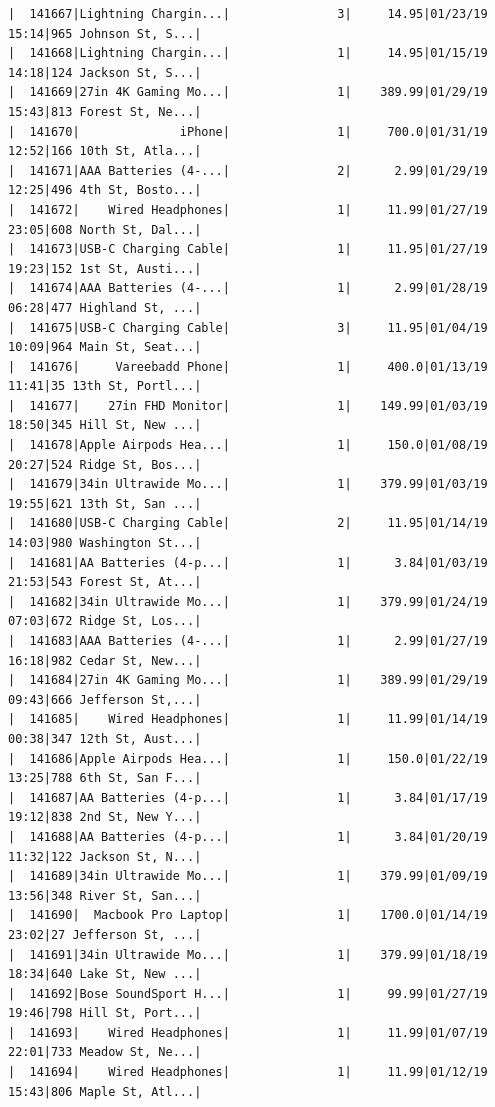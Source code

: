 \documentclass[
  letterpaper,
  DIV=11,
  numbers=noendperiod]{scrartcl}
\begin{document}
\begin{verbatim}
|  141667|Lightning Chargin...|               3|     14.95|01/23/19 15:14|965 Johnson St, S...|
|  141668|Lightning Chargin...|               1|     14.95|01/15/19 14:18|124 Jackson St, S...|
|  141669|27in 4K Gaming Mo...|               1|    389.99|01/29/19 15:43|813 Forest St, Ne...|
|  141670|              iPhone|               1|     700.0|01/31/19 12:52|166 10th St, Atla...|
|  141671|AAA Batteries (4-...|               2|      2.99|01/29/19 12:25|496 4th St, Bosto...|
|  141672|    Wired Headphones|               1|     11.99|01/27/19 23:05|608 North St, Dal...|
|  141673|USB-C Charging Cable|               1|     11.95|01/27/19 19:23|152 1st St, Austi...|
|  141674|AAA Batteries (4-...|               1|      2.99|01/28/19 06:28|477 Highland St, ...|
|  141675|USB-C Charging Cable|               3|     11.95|01/04/19 10:09|964 Main St, Seat...|
|  141676|     Vareebadd Phone|               1|     400.0|01/13/19 11:41|35 13th St, Portl...|
|  141677|    27in FHD Monitor|               1|    149.99|01/03/19 18:50|345 Hill St, New ...|
|  141678|Apple Airpods Hea...|               1|     150.0|01/08/19 20:27|524 Ridge St, Bos...|
|  141679|34in Ultrawide Mo...|               1|    379.99|01/03/19 19:55|621 13th St, San ...|
|  141680|USB-C Charging Cable|               2|     11.95|01/14/19 14:03|980 Washington St...|
|  141681|AA Batteries (4-p...|               1|      3.84|01/03/19 21:53|543 Forest St, At...|
|  141682|34in Ultrawide Mo...|               1|    379.99|01/24/19 07:03|672 Ridge St, Los...|
|  141683|AAA Batteries (4-...|               1|      2.99|01/27/19 16:18|982 Cedar St, New...|
|  141684|27in 4K Gaming Mo...|               1|    389.99|01/29/19 09:43|666 Jefferson St,...|
|  141685|    Wired Headphones|               1|     11.99|01/14/19 00:38|347 12th St, Aust...|
|  141686|Apple Airpods Hea...|               1|     150.0|01/22/19 13:25|788 6th St, San F...|
|  141687|AA Batteries (4-p...|               1|      3.84|01/17/19 19:12|838 2nd St, New Y...|
|  141688|AA Batteries (4-p...|               1|      3.84|01/20/19 11:32|122 Jackson St, N...|
|  141689|34in Ultrawide Mo...|               1|    379.99|01/09/19 13:56|348 River St, San...|
|  141690|  Macbook Pro Laptop|               1|    1700.0|01/14/19 23:02|27 Jefferson St, ...|
|  141691|34in Ultrawide Mo...|               1|    379.99|01/18/19 18:34|640 Lake St, New ...|
|  141692|Bose SoundSport H...|               1|     99.99|01/27/19 19:46|798 Hill St, Port...|
|  141693|    Wired Headphones|               1|     11.99|01/07/19 22:01|733 Meadow St, Ne...|
|  141694|    Wired Headphones|               1|     11.99|01/12/19 15:43|806 Maple St, Atl...|

\end{verbatim}
\end{document}
